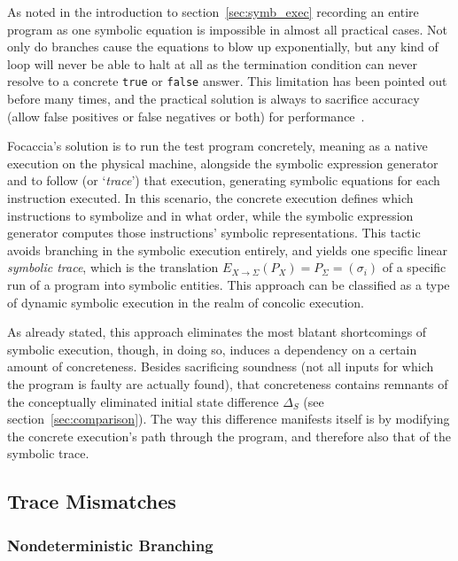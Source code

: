 As noted in the introduction to section~\ref{sec:symb_exec} recording an entire program as one symbolic equation is
impossible in almost all practical cases. Not only do branches cause the equations to blow up exponentially, but any
kind of loop will never be able to halt at all as the termination condition can never resolve to a concrete
\texttt{true} or \texttt{false} answer. This limitation has been pointed out before many times, and the practical
solution is always to sacrifice accuracy (allow false positives or false negatives or both) for
performance~\cite{Baldoni2018SymbexecSurvey}.

Focaccia's solution is to run the test program concretely, meaning as a native execution on the physical machine,
alongside the symbolic expression generator and to follow (or `\textit{trace}') that execution, generating symbolic
equations for each instruction executed. In this scenario, the concrete execution defines which instructions to
symbolize and in what order, while the symbolic expression generator computes those instructions' symbolic
representations. This tactic avoids branching in the symbolic execution entirely, and yields one specific linear
\textit{symbolic trace}, which is the translation $E_{X \rightarrow \Sigma}(P_X) = P_\Sigma = (\sigma_i)$ of a specific
run of a program into symbolic entities. This approach can be classified as a type of dynamic symbolic execution in the
realm of concolic execution.

As already stated, this approach eliminates the most blatant shortcomings of symbolic execution, though, in doing so,
induces a dependency on a certain amount of concreteness. Besides sacrificing soundness (not all inputs for which the
program is faulty are actually found), that concreteness contains remnants of the conceptually eliminated initial state
difference $\Delta_S$ (see section~\ref{sec:comparison}). The way this difference manifests itself is by modifying the
concrete execution's path through the program, and therefore also that of the symbolic trace.

\subsection{Trace Mismatches}\label{sec:trace_mismatch}

\subsubsection{Nondeterministic Branching}

